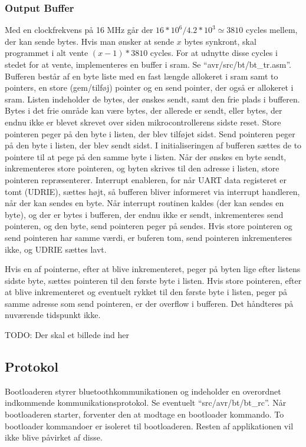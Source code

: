 \subsubsection{Output Buffer}
Med en clockfrekvens på 16 MHz går der $16*10^6 / 4.2*10^3 \simeq 3810$ cycles mellem, der kan sende bytes. Hvis man ønsker at sende $x$ bytes synkront, skal programmet i alt vente $(x-1)*3810$ cycles. For at udnytte disse cycles i stedet for at vente, implementeres en buffer i sram.
Se ``avr/src/bt/bt\_tr.asm''.
Bufferen består af en byte liste med en fast længde allokeret i sram samt to pointers, en store (gem/tilføj) pointer og en send pointer, der også er allokeret i sram. Listen indeholder de bytes, der ønskes sendt, samt den frie plads i bufferen. Bytes i det frie område kan være bytes, der allerede er sendt, eller bytes, der endnu ikke er blevet skrevet over siden mikrocontrollerens sidste reset. Store pointeren peger på den byte i listen, der blev tilføjet sidst. Send pointeren peger på den byte i listen, der blev sendt sidst.
I initialiseringen af bufferen sættes de to pointere til at pege på den samme byte i listen.
Når der ønskes en byte sendt, inkrementeres store pointeren, og byten skrives til den adresse i listen, store pointeren repræsenterer. Interrupt enableren, for når UART data registeret er tomt (UDRIE), sættes højt, så bufferen bliver informeret via interrupt handleren, når der kan sendes en byte.
Når interrupt routinen kaldes (der kan sendes en byte), og der er bytes i bufferen, der endnu ikke er sendt, inkrementeres send pointeren, og den byte, send pointeren peger på sendes. Hvis store pointeren og send pointeren har samme værdi, er buferen tom, send pointeren inkrementeres ikke, og UDRIE sættes lavt.

Hvis en af pointerne, efter at blive inkrementeret, peger på byten lige efter listens sidste byte, sættes pointeren til den første byte i listen.
Hvis store pointeren, efter at blive inkrementeret og eventuelt rykket til den første byte i listen, peger på samme adresse som send pointeren, er der overflow i bufferen. Det håndteres på nuværende tidspunkt ikke.

TODO: Der skal et billede ind her

\subsection{Protokol}
Bootloaderen styrer bluetoothkommunikationen og indeholder en overordnet indkommende kommunikationsprotokol.
Se eventuelt ``src/avr/bt/bt\_rc''.
Når bootloaderen starter, forventer den at modtage en bootloader kommando.
To bootloader kommandoer er isoleret til bootloaderen. Resten af applikationen vil ikke blive påvirket af disse.

